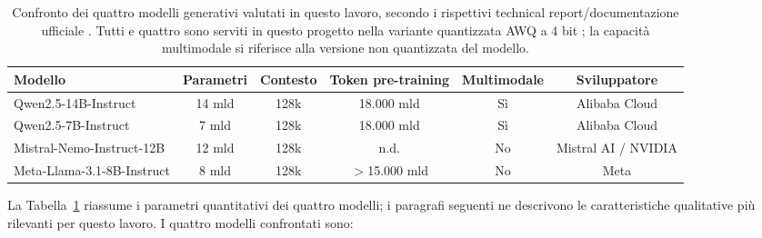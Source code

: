 \begin{table}[htbp]
  \centering
  \small
  \begin{tabular}{@{}lccccc@{}}
    \toprule
    \textbf{Modello} & \textbf{Parametri} & \textbf{Contesto} & \textbf{Token pre-training} & \textbf{Multimodale} & \textbf{Sviluppatore} \\
    \midrule
    Qwen2.5-14B-Instruct      & 14 mld & 128k & 18.000 mld & Sì & Alibaba Cloud \\
    Qwen2.5-7B-Instruct       & 7 mld  & 128k & 18.000 mld & Sì & Alibaba Cloud \\
    Mistral-Nemo-Instruct-12B & 12 mld & 128k & n.d.\footnotemark & No & Mistral AI / NVIDIA \\
    Meta-Llama-3.1-8B-Instruct & 8 mld & 128k & $>$15.000 mld & No & Meta \\
    \bottomrule
  \end{tabular}
  \caption{Confronto dei quattro modelli generativi valutati in questo lavoro, secondo i rispettivi technical
    report/documentazione ufficiale \cite{qwen2024technical, mistralai2024nemo, grattafiori2024llama3}. Tutti e
    quattro sono serviti in questo progetto nella variante quantizzata AWQ a 4 bit \cite{lin2024awq}; la capacità
    multimodale si riferisce alla versione non quantizzata del modello.}
  \label{tab:llm-confronto}
\end{table}

La Tabella~\ref{tab:llm-confronto} riassume i parametri quantitativi dei quattro modelli; i paragrafi seguenti ne
descrivono le caratteristiche qualitative più rilevanti per questo lavoro. I quattro modelli confrontati sono:

